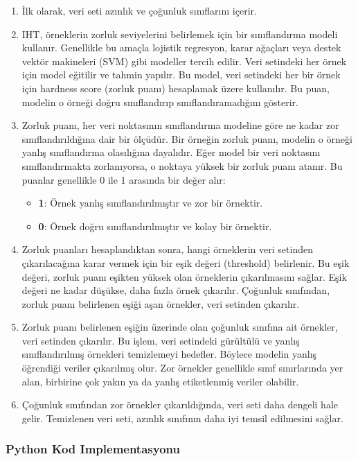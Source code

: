 \begin{enumerate}
    \item İlk olarak, veri seti azınlık ve çoğunluk sınıflarını içerir.
    \item IHT, örneklerin zorluk seviyelerini belirlemek için bir sınıflandırma modeli kullanır. Genellikle bu amaçla lojistik regresyon, karar ağaçları veya destek vektör makineleri (SVM) gibi modeller tercih edilir. Veri setindeki her örnek için model eğitilir ve tahmin yapılır. Bu model, veri setindeki her bir örnek için hardness score (zorluk puanı) hesaplamak üzere kullanılır. Bu puan, modelin o örneği doğru sınıflandırıp sınıflandıramadığını gösterir.
    \item Zorluk puanı, her veri noktasının sınıflandırma modeline göre ne kadar zor sınıflandırıldığına dair bir ölçüdür. Bir örneğin zorluk puanı, modelin o örneği yanlış sınıflandırma olasılığına dayalıdır. Eğer model bir veri noktasını sınıflandırmakta zorlanıyorsa, o noktaya yüksek bir zorluk puanı atanır. Bu puanlar genellikle 0 ile 1 arasında bir değer alır:
    \begin{itemize}
        \item \textbf{1}: Örnek yanlış sınıflandırılmıştır ve zor bir örnektir.
        \item \textbf{0}: Örnek doğru sınıflandırılmıştır ve kolay bir örnektir.
    \end{itemize}
    \item Zorluk puanları hesaplandıktan sonra, hangi örneklerin veri setinden çıkarılacağına karar vermek için bir eşik değeri (threshold) belirlenir. Bu eşik değeri, zorluk puanı eşikten yüksek olan örneklerin çıkarılmasını sağlar. Eşik değeri ne kadar düşükse, daha fazla örnek çıkarılır. Çoğunluk sınıfından, zorluk puanı belirlenen eşiği aşan örnekler, veri setinden çıkarılır.
    \item Zorluk puanı belirlenen eşiğin üzerinde olan çoğunluk sınıfına ait örnekler, veri setinden çıkarılır. Bu işlem, veri setindeki gürültülü ve yanlış sınıflandırılmış örnekleri temizlemeyi hedefler. Böylece modelin yanlış öğrendiği veriler çıkarılmış olur. Zor örnekler genellikle sınıf sınırlarında yer alan, birbirine çok yakın ya da yanlış etiketlenmiş veriler olabilir.
    \item Çoğunluk sınıfından zor örnekler çıkarıldığında, veri seti daha dengeli hale gelir. Temizlenen veri seti, azınlık sınıfının daha iyi temsil edilmesini sağlar.
\end{enumerate}

\subsubsection{Python Kod Implementasyonu}

